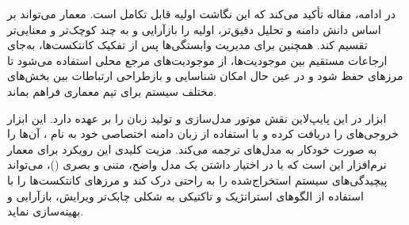 در ادامه، مقاله تأکید می‌کند که این نگاشت اولیه قابل تکامل است. معمار می‌تواند بر اساس دانش دامنه و تحلیل دقیق‌تر،  اولیه را بازآرایی و به چند  کوچک‌تر و معنایی‌تر تقسیم کند. همچنین برای مدیریت وابستگی‌ها پس از تفکیک کانتکست‌ها، به‌جای ارجاعات مستقیم بین موجودیت‌ها، از موجودیت‌های مرجع محلی استفاده می‌شود تا مرزهای  حفظ شود و در عین حال امکان شناسایی و بازطراحی ارتباطات بین بخش‌های مختلف سیستم برای تیم معماری فراهم بماند.

\vspace{0.5em}

ابزار  در این پایپ‌لاین نقش موتور مدل‌سازی و تولید زبان را بر عهده دارد. این ابزار خروجی‌های  را دریافت کرده و با استفاده از زبان دامنه اختصاصی خود به نام ، آن‌ها را به صورت خودکار به مدل‌های  ترجمه می‌کند. مزیت کلیدی این رویکرد برای معمار نرم‌افزار این است که با در اختیار داشتن یک مدل واضح، متنی و بصری ()، می‌تواند پیچیدگی‌های سیستم استخراج‌شده را به راحتی درک کند و مرزهای کانتکست‌ها را با استفاده از الگوهای استراتژیک و تاکتیکی  به شکلی چابک‌تر ویرایش، بازآرایی و بهینه‌سازی نماید.